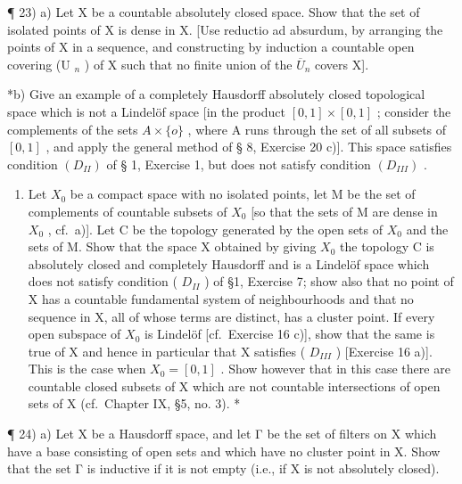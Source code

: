 ¶ 23) a) Let X be a countable absolutely closed space. Show that the set of isolated points of X is dense in X. {[}Use reductio ad absurdum, by arranging the points of X in a sequence, and constructing by induction a countable open covering (U \(_{n}\) ) of X such that no finite union of the \(\overline{U}_{n}\) covers X{]}.

*b) Give an example of a completely Hausdorff absolutely closed topological space which is not a Lindelöf space {[}in the product \([0,1]\times[0,1]\) ; consider the complements of the sets \(A\times\{o\}\) , where A runs through the set of all subsets of \([0,1]\) , and apply the general method of § 8, Exercise 20 c){]}. This space satisfies condition \((D_{II})\) of § 1, Exercise 1, but does not satisfy condition \((D_{III})\) .

\begin{enumerate}
\def\labelenumi{\alph{enumi})}
\setcounter{enumi}{2}
\tightlist
\item
  Let \(X_{0}\) be a compact space with no isolated points, let M be the set of complements of countable subsets of \(X_{0}\) {[}so that the sets of M are dense in \(X_{0}\) , cf.~a){]}. Let C be the topology generated by the open sets of \(X_{0}\) and the sets of M. Show that the space X obtained by giving \(X_{0}\) the topology C is absolutely closed and completely Hausdorff and is a Lindelöf space which does not satisfy condition ( \(D_{II}\) ) of §1, Exercise 7; show also that no point of X has a countable fundamental system of neighbourhoods and that no sequence in X, all of whose terms are distinct, has a cluster point. If every open subspace of \(X_{0}\) is Lindelöf {[}cf.~Exercise 16 c){]}, show that the same is true of X and hence in particular that X satisfies ( \(D_{III}\) ) {[}Exercise 16 a){]}. This is the case when \(X_{0} = [0,1]\) . Show however that in this case there are countable closed subsets of X which are not countable intersections of open sets of X (cf.~Chapter IX, §5, no. 3). *
\end{enumerate}

¶ 24) a) Let X be a Hausdorff space, and let Γ be the set of filters on X which have a base consisting of open sets and which have no cluster point in X. Show that the set Γ is inductive if it is not empty (i.e., if X is not absolutely closed).

